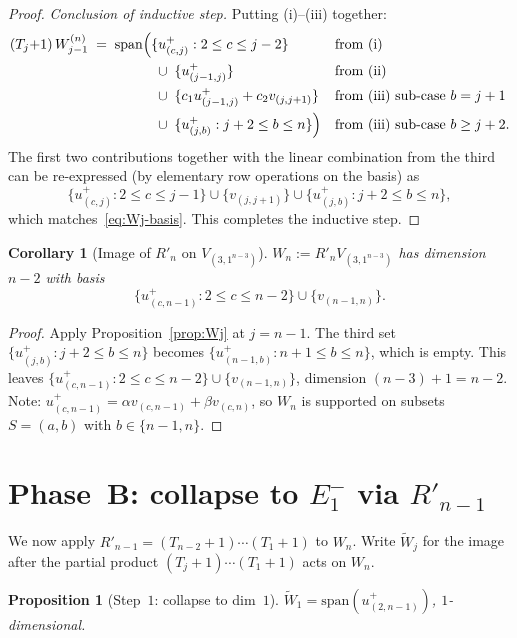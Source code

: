 \documentclass[11pt]{article}
\newtheorem{proposition}[theorem]{Proposition}
\newtheorem{corollary}[theorem]{Corollary}
\theoremstyle{definition}
\begin{document}
\begin{proof}
\emph{Conclusion of inductive step.}  Putting (i)--(iii) together:
\begin{align*}
   (T_j{+}1)\,W_{j-1}^{(n)} \;=\;
   \mathrm{span}\Bigl(
     &\{u^+_{(c,j)} : 2\le c\le j-2\}     &&\text{from (i)}\\
     &\;\cup\;\{u^+_{(j-1,j)}\}            &&\text{from (ii)}\\
     &\;\cup\;\{c_1 u^+_{(j-1,j)} + c_2 v_{(j,j+1)}\} &&\text{from (iii) sub-case $b=j+1$}\\
     &\;\cup\;\{u^+_{(j,b)} : j+2\le b\le n\}\Bigr) &&\text{from (iii) sub-case $b\ge j+2$.}
\end{align*}
The first two contributions together with the linear combination from
the third can be re-expressed (by elementary row operations on the
basis) as
\[
   \{u^+_{(c,j)} : 2\le c\le j-1\}\cup\{v_{(j,j+1)}\}\cup\{u^+_{(j,b)} : j+2\le b\le n\},
\]
which matches~\eqref{eq:Wj-basis}.  This completes the inductive step.
\end{proof}

\begin{corollary}[Image of $R'_n$ on $V_{(3,1^{n-3})}$]\label{cor:Rn-image}
$W_n := R'_n V_{(3,1^{n-3})}$ has dimension $n-2$ with basis
\[
   \{u^+_{(c,n-1)} : 2\le c\le n-2\} \cup \{v_{(n-1,n)}\}.
\]
\end{corollary}

\begin{proof}
Apply Proposition~\ref{prop:Wj} at $j=n-1$.  The third set
$\{u^+_{(j,b)} : j+2\le b\le n\}$ becomes
$\{u^+_{(n-1,b)} : n+1\le b\le n\}$, which is empty.  This leaves
$\{u^+_{(c,n-1)} : 2\le c\le n-2\}\cup\{v_{(n-1,n)}\}$, dimension
$(n-3)+1=n-2$.  Note: $u^+_{(c,n-1)}=\alpha v_{(c,n-1)}+\beta v_{(c,n)}$,
so $W_n$ is supported on subsets $S=(a,b)$ with $b\in\{n-1,n\}$.
\end{proof}

\section{Phase~B: collapse to $E_1^-$ via $R'_{n-1}$}\label{sec:phaseB}

We now apply $R'_{n-1}=(T_{n-2}{+}1)\cdots(T_1{+}1)$ to $W_n$.  Write
$\widetilde W_j$ for the image after the partial product
$(T_j{+}1)\cdots(T_1{+}1)$ acts on $W_n$.

\begin{proposition}[Step~$1$: collapse to dim~$1$]\label{prop:step1}
$\widetilde W_1 = \mathrm{span}(u^+_{(2,n-1)})$, $1$-dimensional.
\end{proposition}
\end{document}
